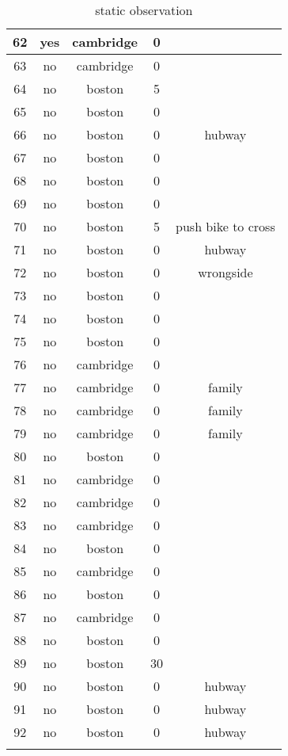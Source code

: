 \begin{longtable}{|c|c|c|c|c|}
62 & yes & cambridge & 0 & \\ \hline
63 & no & cambridge & 0 & \\ \hline
64 & no & boston & 5 \\ \hline
65 & no & boston & 0 & \\ \hline
66 & no & boston & 0 & hubway \\ \hline
67 & no & boston & 0 & \\ \hline
68 & no & boston & 0 & \\ \hline
69 & no & boston & 0 & \\ \hline
70 & no & boston & 5 & push bike to cross \\ \hline
71 & no & boston & 0 & hubway \\ \hline
72 & no & boston & 0 & wrongside \\ \hline
73 & no & boston & 0 & \\ \hline
74 & no & boston & 0 & \\ \hline
75 & no & boston & 0 & \\ \hline
76 & no & cambridge & 0 & \\ \hline
77 & no & cambridge & 0 & family \\ \hline
78 & no & cambridge & 0 & family \\ \hline
79 & no & cambridge & 0 & family \\ \hline
80 & no & boston & 0 & \\ \hline
81 & no & cambridge & 0 & \\ \hline
82 & no & cambridge & 0 & \\ \hline
83 & no & cambridge & 0 & \\ \hline
84 & no & boston & 0 & \\ \hline
85 & no & cambridge & 0 & \\ \hline
86 & no & boston & 0 & \\ \hline
87 & no & cambridge & 0 & \\ \hline
88 & no & boston & 0 & \\ \hline
89 & no & boston & 30 & \\ \hline
90 & no & boston & 0 & hubway \\ \hline
91 & no & boston & 0 & hubway \\ \hline
92 & no & boston & 0 & hubway \\ \hline

\caption{static observation}
\label{tab:static_observation}
\end{longtable}


\clearpage
\newpage
